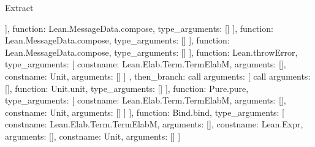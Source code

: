 \begin{lexlean}{Extract}
\begin{toolingmodule}
{{{{{{{{{{{{{{{{{{                                                      ],
                                                      function: Lean.MessageData.compose,
                                                      type_arguments: []
                                                    }
                                                  ],
                                                  function: Lean.MessageData.compose,
                                                  type_arguments: []
                                                }
                                              ],
                                              function: Lean.MessageData.compose,
                                              type_arguments: []
                                            }
                                          ],
                                          function: Lean.throwError,
                                          type_arguments: [
                                            const{name: Lean.Elab.Term.TermElabM, arguments: []},
                                            const{name: Unit, arguments: []}
                                          ]
                                        },
                                        then_branch: call{
                                          arguments: [
                                            call{
                                              arguments: [],
                                              function: Unit.unit,
                                              type_arguments: []
                                            }
                                          ],
                                          function: Pure.pure,
                                          type_arguments: [
                                            const{name: Lean.Elab.Term.TermElabM, arguments: []},
                                            const{name: Unit, arguments: []}
                                          ]
                                        }
                                      }
                                    }
                                  ],
                                  function: Bind.bind,
                                  type_arguments: [
                                    const{name: Lean.Elab.Term.TermElabM, arguments: []},
                                    const{name: Lean.Expr, arguments: []},
                                    const{name: Unit, arguments: []}
                                  ]
                                }
                              }
}}}}}}}}}}
\end{toolingmodule}
\end{lexlean}
